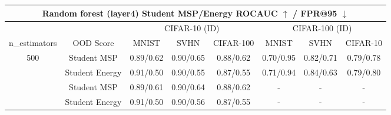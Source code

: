 \documentclass[border=2pt]{standalone}
\begin{document}
\setlength{\tabcolsep}{5pt}
\begin{tabular}{cccccccc}
\multicolumn{8}{c}{\textbf{Random forest (layer4) Student MSP/Energy ROCAUC $\uparrow$ / FPR@95 $\downarrow$}}\\[4pt]
\toprule
 &  & \multicolumn{3}{c}{CIFAR-10 (ID)} & \multicolumn{3}{c}{CIFAR-100 (ID)} \\
\cmidrule(lr){3-5} \cmidrule(lr){6-8}
n\_estimators & OOD Score & MNIST & SVHN & CIFAR-100 & MNIST & SVHN & CIFAR-10 \\
\midrule
500 & Student MSP & 0.89/0.62 & 0.90/0.65 & 0.88/0.62 & 0.70/0.95 & 0.82/0.71 & 0.79/0.78 \\
 & Student Energy & 0.91/0.50 & 0.90/0.55 & 0.87/0.55 & 0.71/0.94 & 0.84/0.63 & 0.79/0.80 \\
\addlinespace
1000 & Student MSP & 0.89/0.61 & 0.90/0.64 & 0.88/0.62 & - & - & - \\
 & Student Energy & 0.91/0.50 & 0.90/0.56 & 0.87/0.55 & - & - & - \\
\bottomrule
\end{tabular}
\end{document}
